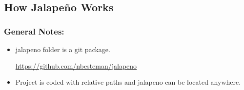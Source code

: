 \documentclass[class=book , crop=false]{standalone}
\title{}  %
\begin{document}

\ifstandalone
\frontmatter %
\maketitle %
\tableofcontents %
\clearpage
\mainmatter %
\fi

\subsection[How Jalape\~no Works]{\large How \LARGE Jalape\~no \large Works}
\subsubsection{General Notes:}
\begin{itemize}
\item jalapeno folder is a git package.

\href{https://github.com/nbesteman/jalapeno}{https://github.com/nbesteman/jalapeno}

\item Project is coded with relative paths and jalapeno can be located anywhere.

\end{itemize}
\end{document}
